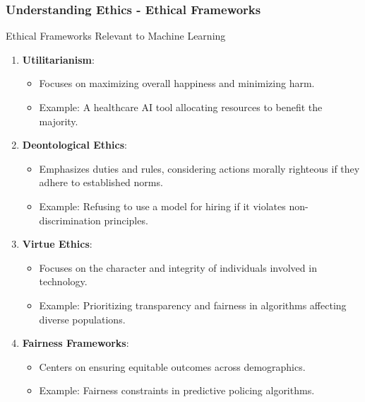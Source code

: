 \documentclass[aspectratio=169]{beamer}
\begin{document}
\begin{frame}[fragile]
    \frametitle{Understanding Ethics - Ethical Frameworks}
    \begin{block}{Ethical Frameworks Relevant to Machine Learning}
        \begin{enumerate}
            \item \textbf{Utilitarianism}:
                \begin{itemize}
                    \item Focuses on maximizing overall happiness and minimizing harm. 
                    \item Example: A healthcare AI tool allocating resources to benefit the majority.
                \end{itemize}
            \item \textbf{Deontological Ethics}:
                \begin{itemize}
                    \item Emphasizes duties and rules, considering actions morally righteous if they adhere to established norms.
                    \item Example: Refusing to use a model for hiring if it violates non-discrimination principles.
                \end{itemize}
            \item \textbf{Virtue Ethics}:
                \begin{itemize}
                    \item Focuses on the character and integrity of individuals involved in technology.
                    \item Example: Prioritizing transparency and fairness in algorithms affecting diverse populations.
                \end{itemize}
            \item \textbf{Fairness Frameworks}:
                \begin{itemize}
                    \item Centers on ensuring equitable outcomes across demographics.
                    \item Example: Fairness constraints in predictive policing algorithms.
                \end{itemize}
        \end{enumerate}
    \end{block}
\end{frame}
\end{document}
